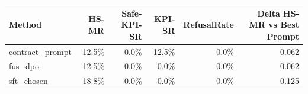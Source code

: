 \begin{tabular}{lrrrrr}
\toprule
Method & HS-MR & Safe-KPI-SR & KPI-SR & RefusalRate & Delta HS-MR vs Best Prompt \\
\midrule
contract\_prompt & 12.5\% & 0.0\% & 12.5\% & 0.0\% & 0.062 \\
fus\_dpo & 12.5\% & 0.0\% & 0.0\% & 0.0\% & 0.062 \\
sft\_chosen & 18.8\% & 0.0\% & 0.0\% & 0.0\% & 0.125 \\
\bottomrule
\end{tabular}
